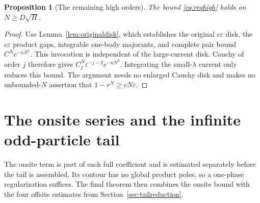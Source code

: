 \documentclass[11pt]{article}
\numberwithin{equation}{section}
\newtheorem{proposition}[theorem]{Proposition}
\theoremstyle{definition}
\newcommand{\eps}{\varepsilon}
\begin{document}
\begin{proposition}[The remaining high orders]\label{prop:highKS}
The bound \eqref{eq:reqhigh} holds on
\(N\ge D\sqrt H\).
\end{proposition}
\begin{proof}
Use Lemma~\ref{lem:originaldisk}, which establishes the original
\(c\eps\) disk, the \(c\eps\) product gaps, integrable one-body
majorants, and complete pair bound \(C^Ne^{-\kappa N^2}\).
This invocation is independent of the large-current disk.
Cauchy of order \(j\) therefore gives
\(C_j^N\eps^{-j-2}e^{-\kappa N^2}\).
Integrating the small-\(\lambda\) current only reduces this bound.
The argument needs no enlarged Cauchy disk and makes no
unbounded-\(N\) assertion that \(1-r^N\ge cN\eps\).
\end{proof}




\section{The onsite series and the infinite odd-particle tail}\label{sec:conclusion}

The onsite term is part of each full coefficient and is estimated
separately before the tail is assembled. Its contour has no global
product poles, so a one-phase regularization suffices. The final theorem
then combines the onsite bound with the four offsite estimates from
Section~\ref{sec:tailreduction}.
\end{document}
